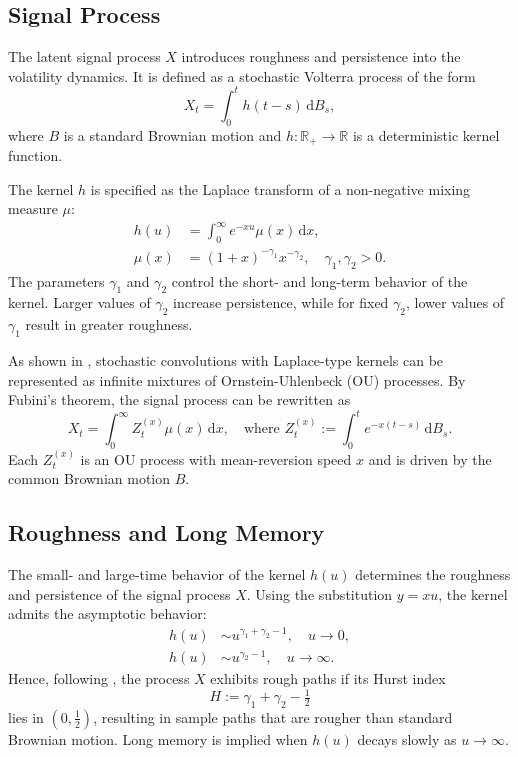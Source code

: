 \subsection{Signal Process} \label{subsec:SignalProcess}

The latent signal process $X$ introduces roughness and persistence into the volatility dynamics. It is defined as a stochastic Volterra process \citep{AbiJaberLarssonPulido2019} of the form
\begin{equation} \label{eq:StochInt}
    X_t = \int_0^t h(t-s) \, \mathrm{d}B_s,
\end{equation}
where $B$ is a standard Brownian motion and $h: \mathbb{R}_+ \to \mathbb{R}$ is a deterministic kernel function.

The kernel $h$ is specified as the Laplace transform of a non-negative mixing measure $\mu$:
\begin{align}
    h(u) &= \int_0^\infty e^{-x u} \mu(x) \,\mathrm{d}x, \label{eq:Kernel}\\
    \mu(x) &= (1+x)^{-\gamma_1} x^{-\gamma_2}, \quad \gamma_1, \gamma_2 > 0. \label{eq:Measure}
\end{align}
The parameters $\gamma_1$ and $\gamma_2$ control the short- and long-term behavior of the kernel. Larger values of $\gamma_2$ increase persistence, while for fixed $\gamma_2$, lower values of $\gamma_1$ result in greater roughness.
 
As shown in \citet{CarmonaCoutin1998}, stochastic convolutions with Laplace-type kernels can be represented as infinite mixtures of Ornstein-Uhlenbeck (OU) processes. By Fubini’s theorem, the signal process can be rewritten as
\begin{equation} \label{eq:Signal}
    X_t = \int_0^\infty Z_t^{(x)} \mu(x) \,\mathrm{d}x, \quad \text{where } Z_t^{(x)} := \int_0^t e^{-x(t-s)} \,\mathrm{d}B_s.
\end{equation}
Each $Z_t^{(x)}$ is an OU process with mean-reversion speed $x$ and is driven by the common Brownian motion $B$.


\subsection{Roughness and Long Memory} \label{subsec:RoughnessLongMemory}

The small- and large-time behavior of the kernel $h(u)$ determines the roughness and persistence of the signal process $X$. Using the substitution $y = x u$, the kernel admits the asymptotic behavior:
\begin{align} \label{eq:KernelAsymptotics}
    h(u) &\sim u^{\gamma_1 + \gamma_2 - 1}, \quad u \to 0, \\
    h(u) &\sim u^{\gamma_2 - 1}, \quad u \to \infty.
\end{align}
Hence, following \citet{BennedsenLundePakkanen2021}, the process $X$ exhibits rough paths if its Hurst index
\begin{equation} \label{eq:HurstIndex}
    H := \gamma_1 + \gamma_2 - \tfrac{1}{2}
\end{equation}
lies in $(0, \tfrac{1}{2})$, resulting in sample paths that are rougher than standard Brownian motion. Long memory is implied when $h(u)$ decays slowly as $u \to \infty$.


